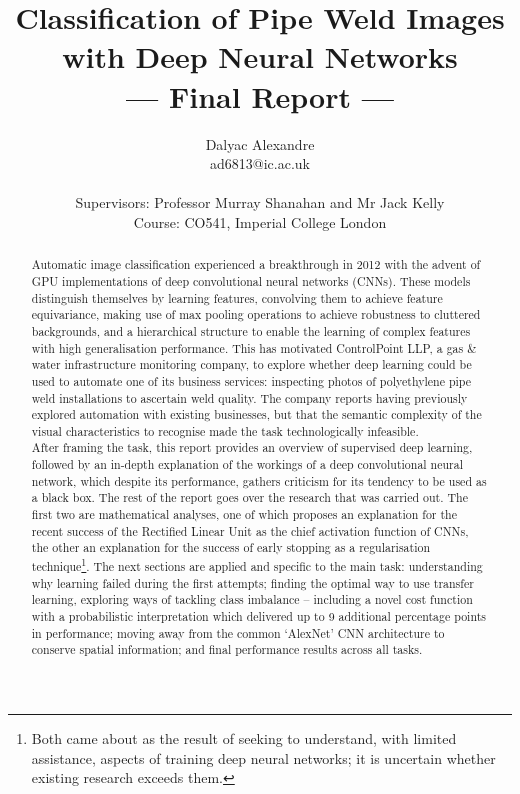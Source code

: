 \documentclass[a4paper,11pt]{article}
\title{Classification of Pipe Weld Images with Deep Neural Networks\\\Large{--- Final Report ---}}
\author{Dalyac Alexandre\\
       ad6813@ic.ac.uk\\ \\
       \small{Supervisors: Professor Murray Shanahan and Mr Jack Kelly}\\
       \small{Course: CO541, Imperial College London}
}
\begin{document}
\maketitle

\begin{abstract}

{
Automatic image classification experienced a breakthrough in 2012 with the advent of GPU implementations of deep convolutional neural networks (CNNs). These models distinguish themselves by learning features, convolving them to achieve feature equivariance, making use of max pooling operations to achieve robustness to cluttered backgrounds, and a hierarchical structure to enable the learning of complex features with high generalisation performance. This has motivated ControlPoint LLP, a gas \& water infrastructure monitoring company, to explore whether deep learning could be used to automate one of its business services: inspecting photos of polyethylene pipe weld installations to ascertain weld quality. The company reports having previously explored automation with existing businesses, but that the semantic complexity of the visual characteristics to recognise made the task technologically infeasible. \\

After framing the task, this report provides an overview of supervised deep learning, followed by an in-depth explanation of the workings of a deep convolutional neural network, which despite its performance, gathers criticism for its tendency to be used as a black box. The rest of the report goes over the research that was carried out. The first two are mathematical analyses, one of which proposes an explanation for the recent success of the Rectified Linear Unit as the chief activation function of CNNs, the other an explanation for the success of early stopping as a regularisation technique\footnote{Both came about as the result of seeking to understand, with limited assistance, aspects of training deep neural networks; it is uncertain whether existing research exceeds them.}. The next sections are applied and specific to the main task: understanding why learning failed during the first attempts; finding the optimal way to use transfer learning, exploring ways of tackling class imbalance -- including a novel cost function with a probabilistic interpretation which delivered up to 9 additional percentage points in performance; moving away from the common `AlexNet' CNN architecture to conserve spatial information; and final performance results across all tasks.
}
\end{abstract}
\end{document}
